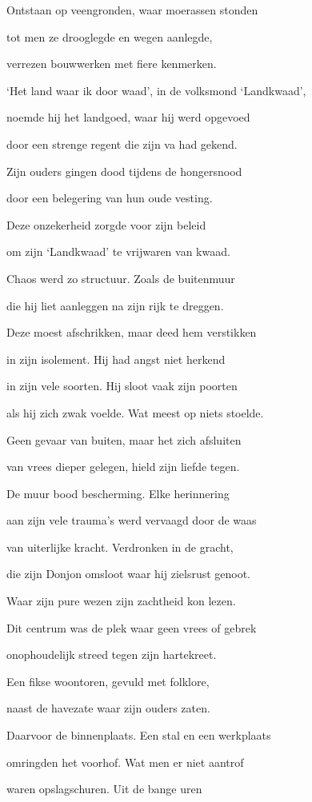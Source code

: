 Ontstaan op veengronden,
waar moerassen stonden

tot men ze drooglegde
en wegen aanlegde,

verrezen bouwwerken
met fiere kenmerken.

‘Het land waar ik door waad’,
in de volksmond ‘Landkwaad’,

noemde hij het landgoed,
waar hij werd opgevoed

door een strenge regent
die zijn va had gekend.

Zijn ouders gingen dood
tijdens de hongersnood

door een belegering
van hun oude vesting.

Deze onzekerheid
zorgde voor zijn beleid

om zijn ‘Landkwaad’
te vrijwaren van kwaad.

Chaos werd zo structuur.
Zoals de buitenmuur

die hij liet aanleggen
na zijn rijk te dreggen.

Deze moest afschrikken,
maar deed hem verstikken

in zijn isolement.
Hij had angst niet herkend

in zijn vele soorten.
Hij sloot vaak zijn poorten

als hij zich zwak voelde.
Wat meest op niets stoelde.

Geen gevaar van buiten,
maar het zich afsluiten

van vrees dieper gelegen,
hield zijn liefde tegen.

De muur bood bescherming.
Elke herinnering

aan zijn vele trauma’s
werd vervaagd door de waas

van uiterlijke kracht.
Verdronken in de gracht,

die zijn Donjon omsloot
waar hij zielsrust genoot.

Waar zijn pure wezen
zijn zachtheid kon lezen.

Dit centrum was de plek
waar geen vrees of gebrek

onophoudelijk streed
tegen zijn hartekreet.

Een fikse woontoren,
gevuld met folklore,

naast de havezate
waar zijn ouders zaten.

Daarvoor de binnenplaats.
Een stal en een werkplaats

omringden het voorhof.
Wat men er niet aantrof

waren opslagschuren.
Uit de bange uren

